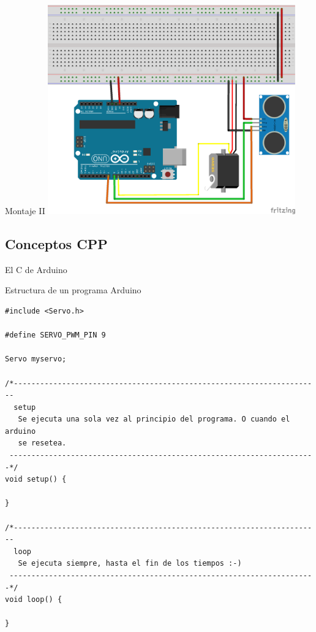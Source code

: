 \begin{frame}{Montaje II}
  \includegraphics [width=0.8\textwidth]{diagram.png}
\end{frame}

\subsection{Conceptos CPP}{El C de Arduino}

\begin{frame}[fragile]{Estructura de un programa Arduino}

\begin{lstlisting}
#include <Servo.h>     

#define SERVO_PWM_PIN 9

Servo myservo;         

/*----------------------------------------------------------------------
  setup
   Se ejecuta una sola vez al principio del programa. O cuando el arduino
   se resetea.
 ----------------------------------------------------------------------*/
void setup() {
  
}

/*----------------------------------------------------------------------
  loop
   Se ejecuta siempre, hasta el fin de los tiempos :-)
 ----------------------------------------------------------------------*/
void loop() {

}
\end{lstlisting}

\end{frame}

